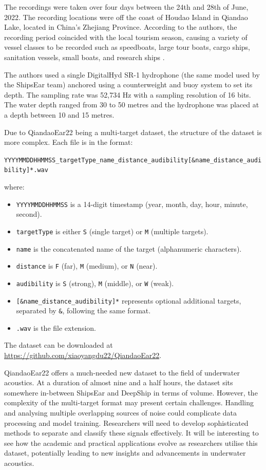 The recordings were taken over four days between the 24th and 28th of June, 2022. The recording locations were off the coast of Houdao Island in Qiandao Lake, located in China's Zhejiang Province. According to the authors, the recording period coincided with the local tourism season, causing a variety of vessel classes to be recorded such as speedboats, large tour boats, cargo ships, sanitation vessels, small boats, and research ships \cite[5]{du_qiandaoear22_2024}.

The authors used a single DigitalHyd SR-1 hydrophone (the same model used by the ShipsEar team) anchored using a counterweight and buoy system to set its depth. The sampling rate was 52,734 Hz with a sampling resolution of 16 bits. The water depth ranged from 30 to 50 metres and the hydrophone was placed at a depth between 10 and 15 metres. 

Due to QiandaoEar22 being a multi-target dataset, the structure of the dataset is more complex. Each file is in the format:

{\small\centerline{\texttt{YYYYMMDDHHMMSS\_targetType\_name\_distance\_audibility[\&name\_distance\_audibility]*.wav}}}

where:
\begin{itemize}
    \item \texttt{YYYYMMDDHHMMSS} is a 14-digit timestamp (year, month, day, hour, minute, second).
    \item \texttt{targetType} is either \texttt{S} (single target) or \texttt{M} (multiple targets).
    \item \texttt{name} is the concatenated name of the target (alphanumeric characters).
    \item \texttt{distance} is \texttt{F} (far), \texttt{M} (medium), or \texttt{N} (near).
    \item \texttt{audibility} is \texttt{S} (strong), \texttt{M} (middle), or \texttt{W} (weak).
    \item \texttt{[\&name\_distance\_audibility]*} represents optional additional targets, separated by \texttt{\&}, following the same format.
    \item \texttt{.wav} is the file extension.
\end{itemize}

The dataset can be downloaded at \url{https://github.com/xiaoyangdu22/QiandaoEar22}.

QiandaoEar22 offers a much-needed new dataset to the field of underwater acoustics. At a duration of almost nine and a half hours, the dataset sits somewhere in-between ShipsEar and DeepShip in terms of volume. However, the complexity of the multi-target format may present certain challenges. Handling and analysing multiple overlapping sources of noise could complicate data processing and model training. Researchers will need to develop sophisticated methods to separate and classify these signals effectively. It will be interesting to see how the academic and practical applications evolve as researchers utilise this dataset, potentially leading to new insights and advancements in underwater acoustics.

